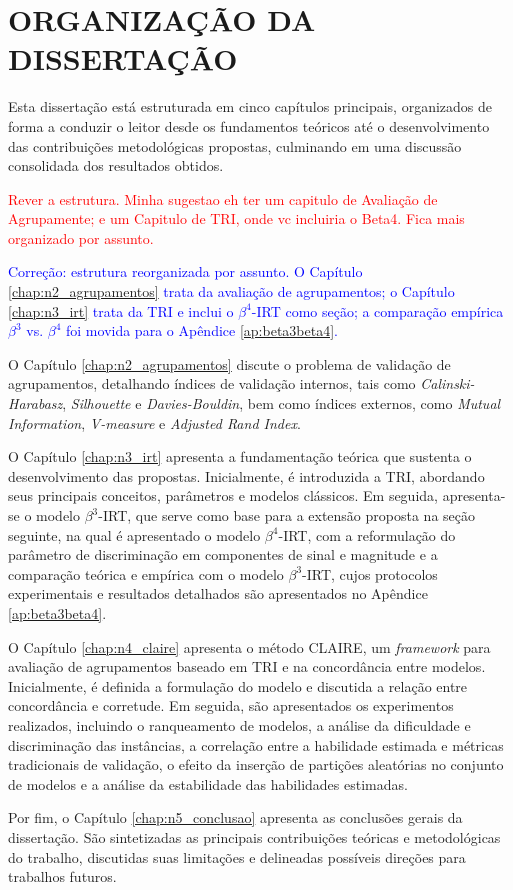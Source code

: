 

\section{ORGANIZAÇÃO DA DISSERTAÇÃO}

Esta dissertação está estruturada em cinco capítulos principais, organizados de forma a conduzir o leitor desde os fundamentos teóricos até o desenvolvimento das contribuições metodológicas propostas, culminando em uma discussão consolidada dos resultados obtidos.

\textcolor{red}{Rever a estrutura. Minha sugestao eh ter um capitulo de Avaliação de Agrupamente; e um Capitulo de TRI, onde vc incluiria o Beta4. Fica mais organizado por assunto.}

\textcolor{blue}{Correção: estrutura reorganizada por assunto. O Capítulo \ref{chap:n2_agrupamentos} trata da avaliação de agrupamentos; o Capítulo \ref{chap:n3_irt} trata da TRI e inclui o $\beta^{4}$-\gls{IRT} como seção; a comparação empírica $\beta^{3}$ vs. $\beta^{4}$ foi movida para o Apêndice \ref{ap:beta3beta4}.}

O Capítulo \ref{chap:n2_agrupamentos} discute o problema de validação de agrupamentos, detalhando índices de validação internos, tais como \textit{Calinski-Harabasz}, \textit{Silhouette} e \textit{Davies-Bouldin}, bem como índices externos, como \textit{Mutual Information}, \textit{V-measure} e \textit{Adjusted Rand Index}.

O Capítulo \ref{chap:n3_irt} apresenta a fundamentação teórica que sustenta o desenvolvimento das propostas. Inicialmente, é introduzida a \gls{TRI}, abordando seus principais conceitos, parâmetros e modelos clássicos. Em seguida, apresenta-se o modelo $\beta^{3}$-\gls{IRT}, que serve como base para a extensão proposta na seção seguinte, na qual é apresentado o modelo $\beta^{4}$-\gls{IRT}, com a reformulação do parâmetro de discriminação em componentes de sinal e magnitude e a comparação teórica e empírica com o modelo $\beta^{3}$-\gls{IRT}, cujos protocolos experimentais e resultados detalhados são apresentados no Apêndice \ref{ap:beta3beta4}.

O Capítulo \ref{chap:n4_claire} apresenta o método \gls{CLAIRE}, um \textit{framework} para avaliação de agrupamentos baseado em \gls{TRI} e na concordância entre modelos. Inicialmente, é definida a formulação do modelo e discutida a relação entre concordância e corretude. Em seguida, são apresentados os experimentos realizados, incluindo o ranqueamento de modelos, a análise da dificuldade e discriminação das instâncias, a correlação entre a habilidade estimada e métricas tradicionais de validação, o efeito da inserção de partições aleatórias no conjunto de modelos e a análise da estabilidade das habilidades estimadas.

Por fim, o Capítulo \ref{chap:n5_conclusao} apresenta as conclusões gerais da dissertação. São sintetizadas as principais contribuições teóricas e metodológicas do trabalho, discutidas suas limitações e delineadas possíveis direções para trabalhos futuros.